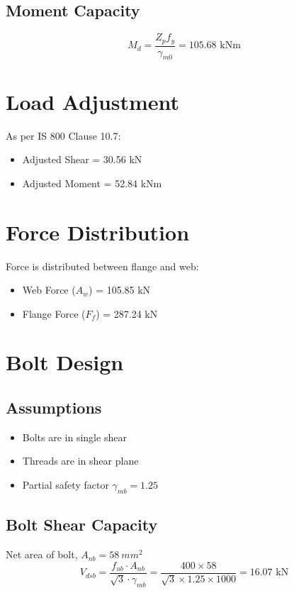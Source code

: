 \subsection{Moment Capacity}
\begin{equation}
M_d = \frac{Z_p f_y}{\gamma_{m0}} = 105.68 \text{ kNm}
\end{equation}

\section{Load Adjustment}
As per IS 800 Clause 10.7:
\begin{itemize}
    \item Adjusted Shear = 30.56 kN
    \item Adjusted Moment = 52.84 kNm
\end{itemize}

\section{Force Distribution}
Force is distributed between flange and web:
\begin{itemize}
    \item Web Force ($A_w$) = 105.85 kN
    \item Flange Force ($F_f$) = 287.24 kN
\end{itemize}

\section{Bolt Design}

\subsection{Assumptions}
\begin{itemize}
    \item Bolts are in single shear
    \item Threads are in shear plane
    \item Partial safety factor $\gamma_{mb} = 1.25$
\end{itemize}

\subsection{Bolt Shear Capacity}
Net area of bolt, $A_{nb} = 58 \ mm^2$
\begin{equation}
V_{dsb} = \frac{f_{ub} \cdot A_{nb}}{\sqrt{3} \cdot \gamma_{mb}}
= \frac{400 \times 58}{\sqrt{3} \times 1.25 \times 1000}
= 16.07 \text{ kN}
\end{equation}

